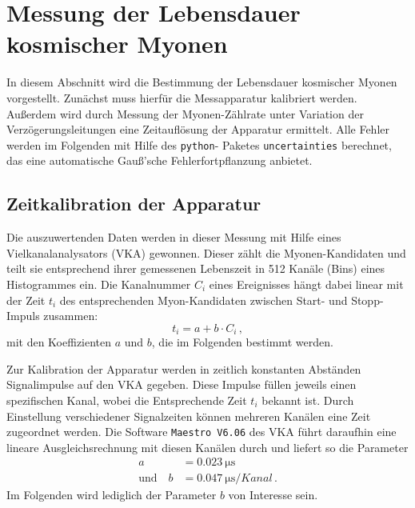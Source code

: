 \section{Messung der Lebensdauer kosmischer Myonen}
\label{sec:messung}
In diesem Abschnitt wird die Bestimmung der Lebensdauer kosmischer Myonen
vorgestellt.
Zunächst muss hierfür die Messapparatur kalibriert werden.
Außerdem wird durch Messung der Myonen-Zählrate unter Variation der
Verzögerungsleitungen eine Zeitauflösung der Apparatur ermittelt.
Alle Fehler werden im Folgenden mit Hilfe des \texttt{python}-
Paketes \texttt{uncertainties} berechnet, das eine automatische
Gauß'sche Fehlerfortpflanzung anbietet.

\subsection{Zeitkalibration der Apparatur}
\label{subsec:kalibration}
Die auszuwertenden Daten werden in dieser Messung mit Hilfe eines
Vielkanalanalysators (VKA) gewonnen.
Dieser zählt die Myonen-Kandidaten und teilt sie entsprechend ihrer
gemessenen Lebenszeit in \num{512} Kanäle (Bins) eines Histogrammes ein.
Die Kanalnummer $C_i$ eines Ereignisses hängt dabei linear mit der
Zeit $t_i$ des entsprechenden Myon-Kandidaten zwischen Start- und
Stopp-Impuls zusammen:
\begin{equation*}
    t_i = a + b \cdot C_i\,,
\end{equation*}
mit den Koeffizienten $a$ und $b$, die im Folgenden bestimmt werden.

Zur Kalibration der Apparatur werden in zeitlich konstanten Abständen
Signalimpulse auf den VKA gegeben.
Diese Impulse füllen jeweils einen spezifischen Kanal, wobei die Entsprechende
Zeit $t_i$ bekannt ist.
Durch Einstellung verschiedener Signalzeiten können mehreren Kanälen eine
Zeit zugeordnet werden.
Die Software \texttt{Maestro V6.06} des VKA führt daraufhin eine lineare Ausgleichsrechnung mit diesen
Kanälen durch und liefert so die Parameter
\begin{align*}
     a &= \SI{0.023}{\micro \second}\\
     \text{und} \quad b &= \SI[per-mode=fraction]{0.047}{\micro \second \per {Kanal}} \,.
 \end{align*}
 Im Folgenden wird lediglich der Parameter $b$ von Interesse sein.

